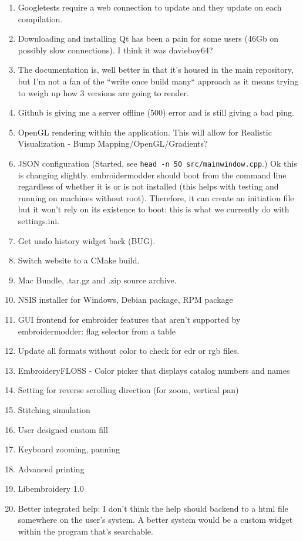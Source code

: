 \documentclass[a4paper]{report}
\begin{document}
\begin{enumerate}
\item Googletests require a web connection to update and they update on each compilation.
\item Downloading and installing Qt has been a pain for some users (46Gb on possibly slow connections). I think it was davieboy64?
\item The documentation is, well better in that it's housed in the main repository, but I'm not a fan of the ``write once build many`` approach as it means trying to weigh up how 3 versions are going to render.
\item Github is giving me a server offline (500) error and is still giving a bad ping.
\item OpenGL rendering within the application. This will allow for Realistic Visualization - Bump Mapping/OpenGL/Gradients?
\item JSON configuration (Started, see \texttt{head -n 50 src/mainwindow.cpp}.) Ok this is changing slightly. embroidermodder should boot from the command line regardless of whether it is or is not installed (this helps with testing and running on machines without root). Therefore, it can create an initiation file but it won't rely on its existence to boot: this is what we currently do with settings.ini.
\item Get undo history widget back (BUG).
\item Switch website to a CMake build.
\item Mac Bundle, .tar.gz and .zip source archive.
\item NSIS installer for Windows, Debian package, RPM package
\item GUI frontend for embroider features that aren't supported by embroidermodder: flag selector from a table
\item Update all formats without color to check for edr or rgb files.
\item EmbroideryFLOSS - Color picker that displays catalog numbers and names
\item Setting for reverse scrolling direction (for zoom, vertical pan)
\item Stitching simulation
\item User designed custom fill
\item Keyboard zooming, panning
\item Advanced printing
\item Libembroidery 1.0
\item Better integrated help: I don't think the help should backend to a html file somewhere on the user's system. A better system would be a custom widget within the program that's searchable.

\end{enumerate}
\end{document}
